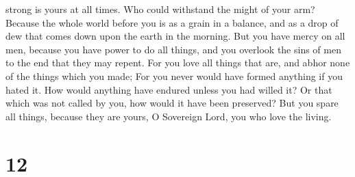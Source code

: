 strong is yours at all times. Who could withstand the might of your arm?
 Because the whole world before you is as a grain in a
balance, and as a drop of dew that comes down upon the earth in the
morning.  But you have mercy on all men, because you have
power to do all things, and you overlook the sins of men to the end that
they may repent.  For you love all things that are, and
abhor none of the things which you made; For you never would have formed
anything if you hated it.  How would anything have endured
unless you had willed it? Or that which was not called by you, how would
it have been preserved?  But you spare all things, because
they are yours, O Sovereign Lord, you who love the living.

\hypertarget{section-11}{%
\section{12}\label{section-11}}

